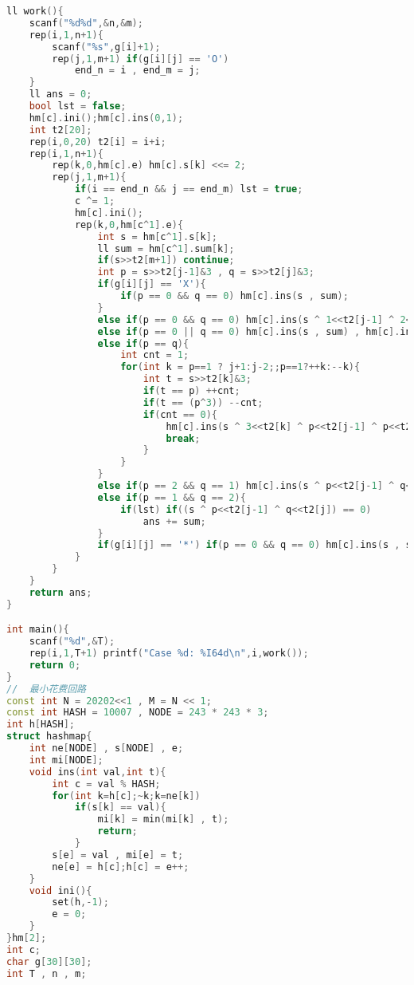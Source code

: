 \begin{lstlisting}[language=C++]
ll work(){
    scanf("%d%d",&n,&m);
    rep(i,1,n+1){
        scanf("%s",g[i]+1);
        rep(j,1,m+1) if(g[i][j] == 'O')
            end_n = i , end_m = j;
    }
    ll ans = 0;
    bool lst = false;
    hm[c].ini();hm[c].ins(0,1);
    int t2[20];
    rep(i,0,20) t2[i] = i+i;
    rep(i,1,n+1){
        rep(k,0,hm[c].e) hm[c].s[k] <<= 2;
        rep(j,1,m+1){
            if(i == end_n && j == end_m) lst = true;
            c ^= 1;
            hm[c].ini();
            rep(k,0,hm[c^1].e){
                int s = hm[c^1].s[k];
                ll sum = hm[c^1].sum[k];
                if(s>>t2[m+1]) continue;
                int p = s>>t2[j-1]&3 , q = s>>t2[j]&3;
                if(g[i][j] == 'X'){
                    if(p == 0 && q == 0) hm[c].ins(s , sum);
                }
                else if(p == 0 && q == 0) hm[c].ins(s ^ 1<<t2[j-1] ^ 2<<t2[j] , sum);
                else if(p == 0 || q == 0) hm[c].ins(s , sum) , hm[c].ins(s ^ (p|q)<<t2[j-1] ^ (p|q)<<t2[j] , sum);
                else if(p == q){
                    int cnt = 1;
                    for(int k = p==1 ? j+1:j-2;;p==1?++k:--k){
                        int t = s>>t2[k]&3;
                        if(t == p) ++cnt;
                        if(t == (p^3)) --cnt;
                        if(cnt == 0){
                            hm[c].ins(s ^ 3<<t2[k] ^ p<<t2[j-1] ^ p<<t2[j] , sum);
                            break;
                        }
                    }
                }
                else if(p == 2 && q == 1) hm[c].ins(s ^ p<<t2[j-1] ^ q<<t2[j] , sum);
                else if(p == 1 && q == 2){
                    if(lst) if((s ^ p<<t2[j-1] ^ q<<t2[j]) == 0)
                        ans += sum;
                }
                if(g[i][j] == '*') if(p == 0 && q == 0) hm[c].ins(s , sum);
            }
        }
    }
    return ans;
}

int main(){
    scanf("%d",&T);
    rep(i,1,T+1) printf("Case %d: %I64d\n",i,work());
    return 0;
}
//	最小花费回路
const int N = 20202<<1 , M = N << 1;
const int HASH = 10007 , NODE = 243 * 243 * 3;
int h[HASH];
struct hashmap{
    int ne[NODE] , s[NODE] , e;
    int mi[NODE];
    void ins(int val,int t){
        int c = val % HASH;
        for(int k=h[c];~k;k=ne[k])
            if(s[k] == val){
                mi[k] = min(mi[k] , t);
                return;
            }
        s[e] = val , mi[e] = t;
        ne[e] = h[c];h[c] = e++;
    }
    void ini(){
        set(h,-1);
        e = 0;
    }
}hm[2];
int c;
char g[30][30];
int T , n , m;


\end{lstlisting}
